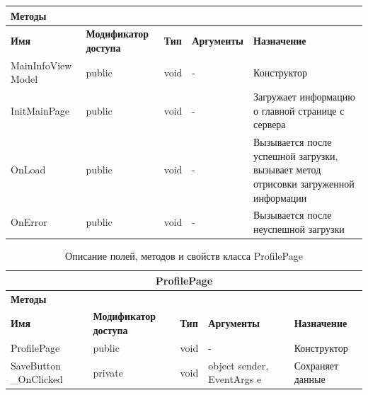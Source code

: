 \documentclass{../includes/TechDoc}
\begin{document}
\begin{table}[ht]
\begin{tabular}{|p{3.2cm}|p{3cm}|p{3.8cm}|p{3cm}|p{3cm}|}
            \multicolumn{5}{|l|}{\textbf{Методы}} \\ \hline
            \textbf{Имя} & \textbf{Модификатор доступа} & \textbf{Тип} & \textbf{Аргументы} & \textbf{Назначение} \\ \hline
            MainInfoView Model & public & void & - & Конструктор \\ \hline
            InitMainPage & public & void & - & Загружает информацию о главной странице с сервера \\ \hline
            OnLoad & public & void & - & Вызывается после успешной загрузки, вызывает метод отрисовки загруженной информации \\ \hline
            OnError & public & void & - & Вызывается после неуспешной загрузки \\ \hline
        \end{tabular}
    \end{table}

    \begin{table}[ht]
        \caption{\label{tab:class-profilepage-table}Описание полей, методов и свойств класса ProfilePage}
        \centering
        \begin{tabular}{|p{3.2cm}|p{3cm}|p{3.8cm}|p{3cm}|p{3cm}|}
            \hline
            \multicolumn{5}{|c|}{ProfilePage} \\ \hline
            \multicolumn{5}{|l|}{\textbf{Методы}} \\ \hline
            \textbf{Имя} & \textbf{Модификатор доступа} & \textbf{Тип} & \textbf{Аргументы} & \textbf{Назначение} \\ \hline
            ProfilePage & public & void & - & Конструктор \\ \hline
            SaveButton \_OnClicked & private & void & object sender, EventArgs e & Сохраняет данные \\ \hline
        \end{tabular}
    \end{table}
\end{document}
